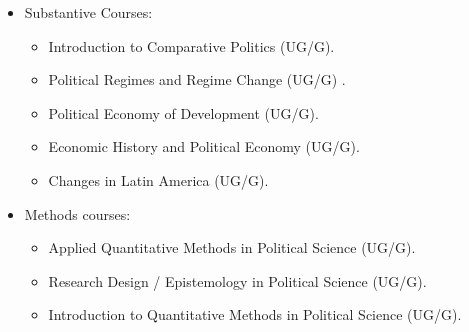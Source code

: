 \documentclass[11pt]{letter} %
\begin{document}
\begin{letter}{}





\begin{itemize}
\item Substantive Courses:
	\begin{itemize}
	\item Introduction to Comparative Politics (UG/G).
	\item Political Regimes and Regime Change (UG/G) .
	\item Political Economy of Development (UG/G).
	\item Economic History and Political Economy (UG/G).
	\item Changes in Latin America (UG/G).
	\end{itemize}
\item Methods courses:
	\begin{itemize}
	\item Applied Quantitative Methods in Political Science (UG/G).
	\item Research Design / Epistemology in Political Science (UG/G).
	\item Introduction to Quantitative Methods in Political Science (UG/G).
	\end{itemize}
\end{itemize}



\end{letter}
\end{document}
